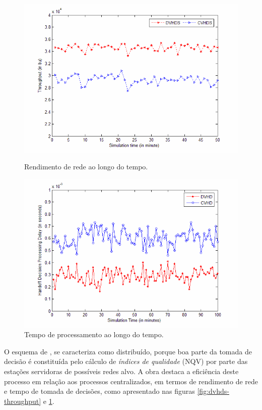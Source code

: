 \documentclass[12pt]{article}
\begin{document}
\begin{figure}[h!]
	\begin{minipage}[b]{0.5\linewidth}
		\centering
		\includegraphics[width=\textwidth]{artigo-junho/dvhds-throughput.png}
		\caption{Rendimento de rede ao longo do tempo.}
		\label{fig:dvhds-throughput}
	\end{minipage}
	\begin{minipage}[b]{0.5\linewidth}
		\centering
		\includegraphics[width=\textwidth]{artigo-junho/dvhds-procdelay.png}
		\caption{Tempo de processamento ao longo do tempo.}
		\label{fig:dvhds-procdelay}
	\end{minipage}
\end{figure}

O esquema de \cite{tawil:2008}, se caracteriza como distribuído, porque boa 
parte da tomada de decisão é constituída pelo cálculo de \textit{índices de 
qualidade} (NQV) por parte das estações servidoras de possíveis redes alvo. A 
obra destaca a eficiência deste processo em relação aos processos 
centralizados, em termos de rendimento de rede e tempo de tomada de decisões, 
como apresentado nas figuras \ref{fig:dvhds-throughput} e 
\ref{fig:dvhds-procdelay}.  
\end{document}
